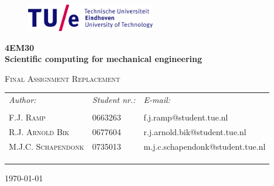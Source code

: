 
\begin{titlepage}

\begin{center}

\begin{figure}[h!]
    \parbox [t]{\textwidth}
        {
        \center
        \includegraphics[width=0.5\textwidth]{Logos/TUe.png}
        }
\end{figure}

\vspace{10 mm}

\textbf{\huge {\bf 4EM30}}\\[0.9cm]



{ \huge \bfseries  Scientific computing for mechanical engineering }\\[0.4cm]


\vspace{20 mm}

\textsc{\huge Final Assignment Replacement}\\[0.9cm]

\vspace{30 mm}

\begin{center}
    \begin{tabular}{ l l l }
	\emph{Author:}			& \emph{Student nr.:}	& \emph{E-mail:}		\\
	\\	
	F.J. \textsc{Ramp}	 & 0663263 & f.j.ramp@student.tue.nl\\
	R.J. \textsc{Arnold Bik}	 & 0677604 & r.j.arnold.bik@student.tue.nl\\
	M.J.C. \textsc{Schapendonk}	 & 0735013 & m.j.c.schapendonk@student.tue.nl\\
	
	\\
	\\\\
    \end{tabular}
    \end{center}


\vfill

{\large \today} \\

\end{center}

\end{titlepage} 